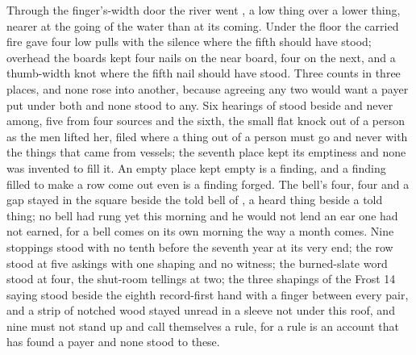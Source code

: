 Through the finger's-width door the river went , a low thing over a lower thing, nearer at the going of the water than at its coming. Under the floor the carried fire gave four low pulls with the silence where the fifth should have stood; overhead the boards kept four nails on the near board, four on the next, and a thumb-width knot where the fifth nail should have stood. Three counts in three places, and none rose into another, because agreeing any two would want a payer put under both and none stood to any. Six hearings of  stood beside and never among, five from four sources and the sixth, the small flat knock out of a person as the men lifted her, filed where a thing out of a person must go and never with the things that came from vessels; the seventh place kept its emptiness and none was invented to fill it. An empty place kept empty is a finding, and a finding filled to make a row come out even is a finding forged. The bell's four, four and a gap stayed in the square beside the told bell of , a heard thing beside a told thing; no bell had rung yet this morning and he would not lend an ear one had not earned, for a bell comes on its own morning the way a month comes. Nine stoppings stood with no tenth before the seventh year at its very end; the row stood at five askings with one shaping and no witness; the burned-slate word stood at four, the shut-room tellings at two; the three shapings of the Frost 14 saying stood beside the eighth record-first hand with a finger between every pair, and a strip of notched wood stayed unread in a sleeve not under this roof, and nine must not stand up and call themselves a rule, for a rule is an account that has found a payer and none stood to these.

